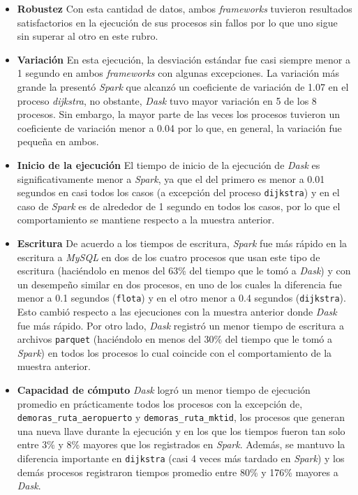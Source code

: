 \begin{itemize}
	\item \textbf{Robustez} Con esta cantidad de datos, ambos \textit{frameworks} tuvieron resultados satisfactorios en la ejecución de sus procesos sin fallos por lo que uno sigue sin superar al otro en este rubro.
	
	\item \textbf{Variación} En esta ejecución, la desviación estándar fue casi siempre menor a 1 segundo en ambos \textit{frameworks} con algunas excepciones. La variación más grande la presentó \textit{Spark} que alcanzó un coeficiente de variación de 1.07 en el proceso \textit{dijkstra}, no obstante, \textit{Dask} tuvo mayor variación en 5 de los 8 procesos. Sin embargo, la mayor parte de las veces los procesos tuvieron un coeficiente de variación menor a 0.04 por lo que, en general, la variación fue pequeña en ambos.
	
	\item \textbf{Inicio de la ejecución} El tiempo de inicio de la ejecución de \textit{Dask} es significativamente menor a \textit{Spark}, ya que el del primero es menor a 0.01 segundos en casi todos los casos (a excepción del proceso \texttt{dijkstra}) y en el caso de \textit{Spark} es de alrededor de 1 segundo en todos los casos, por lo que el comportamiento se mantiene respecto a la muestra anterior.
	
	\item \textbf{Escritura} De acuerdo a los tiempos de escritura, \textit{Spark} fue más rápido en la escritura a \textit{MySQL} en dos de los cuatro procesos que usan este tipo de escritura (haciéndolo en menos del 63\% del tiempo que le tomó a \textit{Dask}) y con un desempeño similar en dos procesos, en uno de los cuales la diferencia fue menor a 0.1 segundos (\texttt{flota}) y en el otro menor a 0.4 segundos (\texttt{dijkstra}). Esto cambió respecto a las ejecuciones con la muestra anterior donde \textit{Dask} fue más rápido. Por otro lado, \textit{Dask} registró un menor tiempo de escritura a archivos \texttt{parquet} (haciéndolo en menos del 30\% del tiempo que le tomó a \textit{Spark}) en todos los procesos lo cual coincide con el comportamiento de la muestra anterior. 
	
	\item \textbf{Capacidad de cómputo} \textit{Dask} logró un menor tiempo de ejecución promedio en prácticamente todos los procesos con la excepción de, \texttt{demoras\_ruta\_aeropuerto} y \texttt{demoras\_ruta\_mktid}, los procesos que generan una nueva llave durante la ejecución y en los que los tiempos fueron tan solo entre 3\% y 8\% mayores que los registrados en \textit{Spark}. Además, se mantuvo la diferencia importante en \texttt{dijkstra} (casi 4 veces más tardado en \textit{Spark}) y los demás procesos registraron tiempos promedio entre 80\% y 176\% mayores a \textit{Dask}.
	

\end{itemize}
